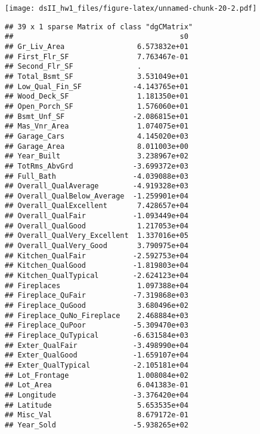 \documentclass[
]{article}
\newenvironment{Shaded}{\begin{snugshade}}{\end{snugshade}}
\newcommand{\AttributeTok}[1]{\textcolor[rgb]{0.13,0.29,0.53}{#1}}
\newcommand{\ConstantTok}[1]{\textcolor[rgb]{0.56,0.35,0.01}{#1}}
\newcommand{\DecValTok}[1]{\textcolor[rgb]{0.00,0.00,0.81}{#1}}
\newcommand{\FunctionTok}[1]{\textcolor[rgb]{0.13,0.29,0.53}{\textbf{#1}}}
\newcommand{\NormalTok}[1]{#1}
\newcommand{\OtherTok}[1]{\textcolor[rgb]{0.56,0.35,0.01}{#1}}
\newcommand{\SpecialCharTok}[1]{\textcolor[rgb]{0.81,0.36,0.00}{\textbf{#1}}}
\newcommand{\StringTok}[1]{\textcolor[rgb]{0.31,0.60,0.02}{#1}}
\begin{document}
\begin{Shaded}
\end{Shaded}

\texttt{[image: dsII\_hw1\_files/figure-latex/unnamed-chunk-20-2.pdf]}

\begin{Shaded}
\end{Shaded}

\begin{verbatim}
## 39 x 1 sparse Matrix of class "dgCMatrix"
##                                       s0
## Gr_Liv_Area                 6.573832e+01
## First_Flr_SF                7.763467e-01
## Second_Flr_SF               .           
## Total_Bsmt_SF               3.531049e+01
## Low_Qual_Fin_SF            -4.143765e+01
## Wood_Deck_SF                1.181350e+01
## Open_Porch_SF               1.576060e+01
## Bsmt_Unf_SF                -2.086815e+01
## Mas_Vnr_Area                1.074075e+01
## Garage_Cars                 4.145020e+03
## Garage_Area                 8.011003e+00
## Year_Built                  3.238967e+02
## TotRms_AbvGrd              -3.699372e+03
## Full_Bath                  -4.039088e+03
## Overall_QualAverage        -4.919328e+03
## Overall_QualBelow_Average  -1.259901e+04
## Overall_QualExcellent       7.428657e+04
## Overall_QualFair           -1.093449e+04
## Overall_QualGood            1.217053e+04
## Overall_QualVery_Excellent  1.337016e+05
## Overall_QualVery_Good       3.790975e+04
## Kitchen_QualFair           -2.592753e+04
## Kitchen_QualGood           -1.819803e+04
## Kitchen_QualTypical        -2.624123e+04
## Fireplaces                  1.097388e+04
## Fireplace_QuFair           -7.319868e+03
## Fireplace_QuGood            3.680496e+02
## Fireplace_QuNo_Fireplace    2.468884e+03
## Fireplace_QuPoor           -5.309470e+03
## Fireplace_QuTypical        -6.631584e+03
## Exter_QualFair             -3.498990e+04
## Exter_QualGood             -1.659107e+04
## Exter_QualTypical          -2.105181e+04
## Lot_Frontage                1.008084e+02
## Lot_Area                    6.041383e-01
## Longitude                  -3.376420e+04
## Latitude                    5.653535e+04
## Misc_Val                    8.679172e-01
## Year_Sold                  -5.938265e+02
\end{verbatim}
\end{document}
